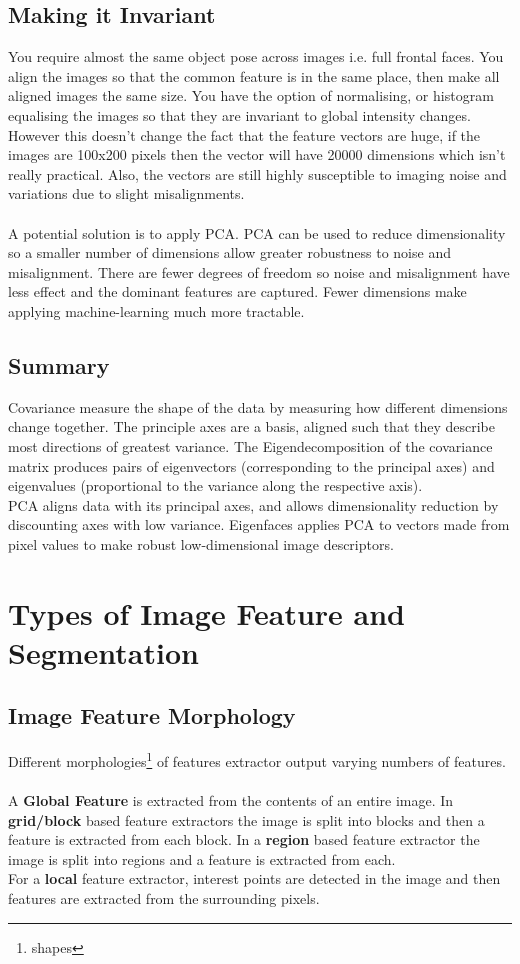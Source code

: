 \documentclass{article}
\begin{document}
	\subsection{Making it Invariant}
	You require almost the same object pose across images i.e. full frontal faces. You align the images so that the common feature is in the same place, then make all aligned images the same size. You have the option of normalising, or histogram equalising the images so that they are invariant to global intensity changes.\\
	However this doesn't change the fact that the feature vectors are huge, if the images are 100x200 pixels then the vector will have 20000 dimensions which isn't really practical. Also, the vectors are still highly susceptible to imaging noise and variations due to slight misalignments.\\
	\\
	A potential solution is to apply PCA. PCA can be used to reduce dimensionality so a smaller number of dimensions allow greater robustness to noise and misalignment. There are fewer degrees of freedom so noise and misalignment have less effect and the dominant features are captured. Fewer dimensions make applying machine-learning much more tractable.
	\subsection{Summary}
	Covariance measure the shape of the data by measuring how different dimensions change together. The principle axes are a basis, aligned such that they describe most directions of greatest variance. The Eigendecomposition of the covariance matrix produces pairs of eigenvectors (corresponding to the principal axes) and eigenvalues (proportional to the variance along the respective axis).\\
	PCA aligns data with its principal axes, and allows dimensionality reduction by discounting axes with low variance. Eigenfaces applies PCA to vectors made from pixel values to make robust low-dimensional image descriptors.
	
	\section{Types of Image Feature and Segmentation}
	\subsection{Image Feature Morphology}
	Different morphologies\footnote{shapes} of features extractor output varying numbers of features.\\
	\\
	A \textbf{Global Feature} is extracted from the contents of an entire image. In \textbf{grid/block} based feature extractors the image is split into blocks and then a feature is extracted from each block. In a \textbf{region} based feature extractor the image is split into regions and a feature is extracted from each.\\
	For a \textbf{local} feature extractor, interest points are detected in the image and then features are extracted from the surrounding pixels.
\end{document}
